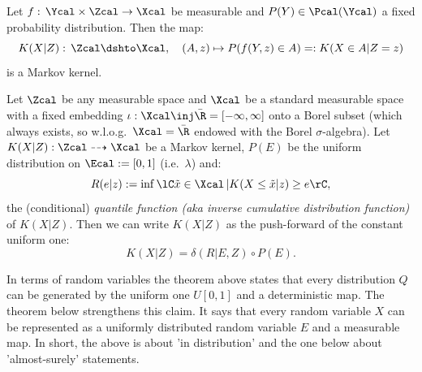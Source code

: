 \begin{Rem}\label{rem:Markov_kernel_from_family_of_distributions}
    Let $f:\, \Ycal \times \Zcal \to \Xcal$ be measurable
    and $P(Y) \in \Pcal(\Ycal)$ a fixed probability distribution.
    Then the map:
    \[ K(X|Z):\,\Zcal \dshto \Xcal,\quad (A,z) \mapsto P(f(Y,z) \in A)=:K(X \in A|Z=z)  \]
    is a Markov kernel.
\end{Rem}

\begin{Thm}
    Let $\Zcal$ be any measurable space and $\Xcal$ be a standard measurable space with a fixed embedding $\iota: \Xcal \inj \bar\R=[-\infty,\infty]$ onto a Borel subset (which always exists, so w.l.o.g.\ $\Xcal = \bar\R$ endowed with the Borel $\sigma$-algebra).
    Let $K(X|Z) : \Zcal \dasharrow \Xcal$ be a Markov kernel, $P(E)$ be the uniform distribution on $\Ecal:=[0,1]$ (i.e.\ $\lambda$) and:
    \[ 	R(e|z) := \inf \lC \tilde{x} \in \Xcal\,| K(X \le \tilde{x}|z) \ge e \rC,\]
    the (conditional) \emph{quantile function (aka inverse cumulative distribution function)} of $K(X|Z)$.
    Then we can write $K(X|Z)$ as the push-forward of the constant uniform one:
    \[ K(X|Z) = \delta(R|E,Z) \circ P(E).\]
\end{Thm}

In terms of random variables the theorem above states that every distribution $Q$ can be generated by the uniform one $U[0,1]$ and a deterministic map. The theorem below strengthens this claim. It says that every random variable $X$ can be represented as a 
uniformly distributed random variable $E$ and a measurable map. In short, the above is about 'in distribution' and the one below about 'almost-surely' statements.


